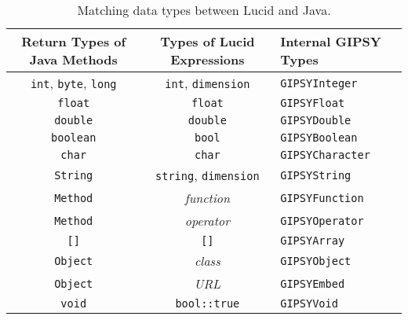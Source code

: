 \documentclass{easychair}
\newcommand{\api}[1]{\texttt{#1}\index{API!#1}}
\begin{document}
\begin{table}
\centering
\caption{Matching data types between Lucid and Java.}
\label{tab:datatypes}
\begin{minipage}[b]{\textwidth}
\begin{center}
\begin{tabular}{|c|c|l|} \hline
{\scriptsize Return Types of Java Methods}  & {\scriptsize Types of Lucid Expressions} & {\scriptsize Internal GIPSY Types}\\ \hline\hline
\api{int}, \api{byte}, \api{long}           & \api{int}, \api{dimension}               & \api{GIPSYInteger} \\
\api{float}                                 & \api{float}                              & \api{GIPSYFloat} \\
\api{double}                                & \api{double}                             & \api{GIPSYDouble} \\
\api{boolean}                               & \api{bool}                               & \api{GIPSYBoolean} \\
\api{char}                                  & \api{char}                               & \api{GIPSYCharacter} \\
\api{String}                                & \api{string}, \api{dimension}            & \api{GIPSYString} \\
\api{Method}                                & {\it function}                           & \api{GIPSYFunction} \\
\api{Method}                                & {\it operator}                           & \api{GIPSYOperator} \\
\api{[]}                                    & \api{[]}                                 & \api{GIPSYArray} \\
\api{Object}                                & {\it class}                              & \api{GIPSYObject} \\
\api{Object}                                & {\it URL}                                & \api{GIPSYEmbed} \\
\api{void}                                  & \api{bool::true}                         & \api{GIPSYVoid} \\ \hline\hline


\end{tabular}
\end{center}
\end{minipage}
\end{table}
\end{document}
